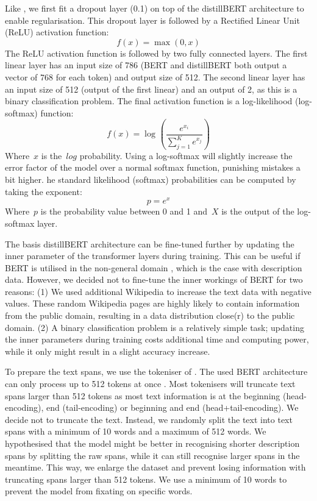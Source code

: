 \documentclass[a4paper, 12pt, oneside]{book} %
\begin{document}
Like \textcite{sun_how_2020}, we first fit a dropout layer (0.1) on top of the distillBERT architecture to enable regularisation.
This dropout layer is followed by a Rectified Linear Unit (ReLU) activation function:
\begin{equation} \label{ReLU}
    f(x) = \max(0, x)
\end{equation}
The ReLU activation function is followed by two fully connected layers.
The first linear layer has an input size of 786 (BERT and distillBERT both output a vector of 768 for each token) and output size of 512.
The second linear layer has an input size of 512 (output of the first linear) and an output of 2, as this is a binary classification problem.
The final activation function is a log-likelihood (log-softmax) function:
\begin{equation} \label{eq:logsoftmax}
    f(x) = \log_{}(\frac{e^{x_i}}{\sum_{j=1}^K e^{x_j}})
\end{equation}
Where~$x$ is the~$log$ probability.
Using a log-softmax will slightly increase the error factor of the model over a normal softmax function, punishing mistakes a bit higher.
he standard likelihood (softmax) probabilities can be computed by taking the exponent:
\begin{equation}
    p = e^{x} 
\end{equation}
Where~$p$ is the probability value between 0 and 1 and~$X$ is the output of the log-softmax layer.

The basis distillBERT architecture can be fine-tuned further by updating the inner parameter of the transformer layers during training. 
This can be useful if BERT is utilised in the non-general domain \autocite{devlin_bert_2019, sun_how_2020, sanh_distilbert_2020}, which is the case with description data.
However, we decided not to fine-tune the inner workings of BERT for two reasons: 
(1) We used additional Wikipedia to increase the text data with negative values.
These random Wikipedia pages are highly likely to contain information from the public
domain, resulting in a  data distribution close(r) to the public domain.
(2) A binary classification problem is a relatively simple task; updating the inner parameters during training costs additional time and computing power, while it only might result in a slight accuracy increase.

To prepare the text spans, we use the tokeniser of \textcite{wolf_huggingfaces_2020}.
The used BERT architecture can only process up to 512 tokens at once \autocite{sanh_distilbert_2020, devlin_bert_2019}.
Most tokenisers will truncate text spans larger than 512 tokens as most text information is at the beginning (head-encoding), end (tail-encoding) or beginning and end (head+tail-encoding).
We decide not to truncate the text.
Instead, we randomly split the text into text spans with a minimum of 10 words and a maximum of 512 words.
We hypothesised that the model might be better in recognising shorter description spans by splitting the raw spans, while it can still recognise larger spans in the meantime.  
This way, we enlarge the dataset and prevent losing information with truncating spans larger than 512 tokens. 
We use a minimum of 10 words to prevent the model from fixating on specific words.
\end{document}
